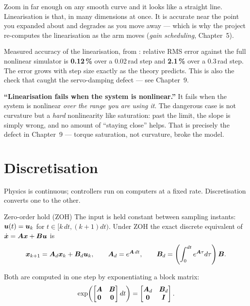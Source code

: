 \begin{intuition}
Zoom in far enough on any smooth curve and it looks like a straight line. Linearisation is that, in many
dimensions at once. It is accurate near the point you expanded about and degrades as you move away ---
which is why the project re-computes the linearisation as the arm moves (\emph{gain scheduling},
Chapter~5).
\end{intuition}

\begin{inproject}
Measured accuracy of the linearisation, from : relative RMS error against
the full nonlinear simulator is \textbf{0.12\,\%} over a 0.02\,rad step and \textbf{2.1\,\%} over a
0.3\,rad step. The error grows with step size exactly as the theory predicts. This is also the check that
caught the servo-damping defect --- see Chapter~9.
\end{inproject}

\begin{pitfall}
\textbf{``Linearisation fails when the system is nonlinear.''} It fails when the system is nonlinear
\emph{over the range you are using it}. The dangerous case is not curvature but a \emph{hard} nonlinearity
like saturation: past the limit, the slope is simply wrong, and no amount of ``staying close'' helps. That
is precisely the defect in Chapter~9 --- torque saturation, not curvature, broke the model.
\end{pitfall}

\section{Discretisation}

Physics is continuous; controllers run on computers at a fixed rate. Discretisation converts one to the
other.

\begin{definition}{Zero-order hold (ZOH)}
The input is held constant between sampling instants: $\bm{u}(t) = \bm{u}_k$ for $t \in [k\,dt, (k{+}1)dt)$.
Under ZOH the exact discrete equivalent of $\dot{\bm{x}} = \bm{A}\bm{x} + \bm{B}\bm{u}$ is
\[
\bm{x}_{k+1} = \bm{A}_d \bm{x}_k + \bm{B}_d \bm{u}_k, \qquad
\bm{A}_d = e^{\bm{A}\,dt}, \qquad
\bm{B}_d = \left(\int_0^{dt} e^{\bm{A}\tau}d\tau\right)\bm{B} .
\]
\end{definition}

Both are computed in one step by exponentiating a block matrix:
\[
\exp\!\left(\begin{bmatrix} \bm{A} & \bm{B} \\ \bm{0} & \bm{0}\end{bmatrix} dt\right)
= \begin{bmatrix} \bm{A}_d & \bm{B}_d \\ \bm{0} & \bm{I} \end{bmatrix}.
\]

